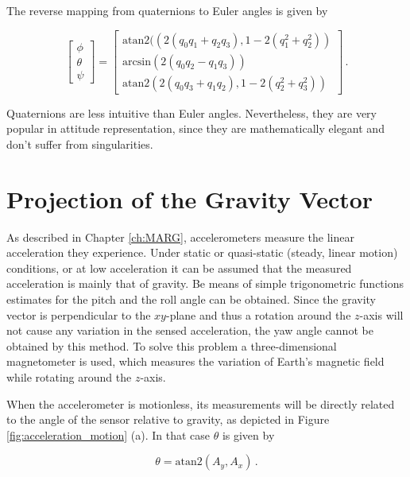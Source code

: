 \noindent
The reverse mapping from quaternions to Euler angles is given by

\begin{equation}
  \begin{bmatrix}
\phi \\ \theta \\ \psi
\end{bmatrix} =
\begin{bmatrix}
\mbox{atan}2 ((2(q_0 q_1 + q_2 q_3), 1 - 2(q_1^2 + q_2^2)) \\
\mbox{arcsin} (2(q_0 q_2 - q_1 q_3)) \\
\mbox{atan}2 (2(q_0 q_3 + q_1 q_2), 1 - 2(q_2^2 + q_3^2))
\end{bmatrix}\,.
\end{equation}

Quaternions are less intuitive than Euler angles. Nevertheless, they are very popular in attitude representation, since they are mathematically elegant and don't suffer from singularities.

\section{Projection of the Gravity Vector}


As described in Chapter \ref{ch:MARG}, accelerometers measure the linear acceleration they experience. Under static or quasi-static (steady, linear motion) conditions, or at low acceleration it can be assumed that the measured acceleration is mainly that of gravity. Be means of simple trigonometric functions estimates for the pitch and the roll angle can be obtained. Since the gravity vector is perpendicular to the $xy$-plane and thus a rotation around the $z$-axis will not cause any variation in the sensed acceleration, the yaw angle cannot be obtained by this method. To solve this problem a three-dimensional magnetometer is used, which measures the variation of Earth's magnetic field while rotating around the $z$-axis.

When the accelerometer is motionless, its measurements will be directly related to the angle of the sensor relative to gravity, as depicted in Figure \ref{fig:acceleration_motion} (a). In that case $\theta$ is given by

\begin{equation} \label{eq:projection_gravity}
  \theta = \mbox{atan}2(A_y, A_x)\,.
\end{equation}

